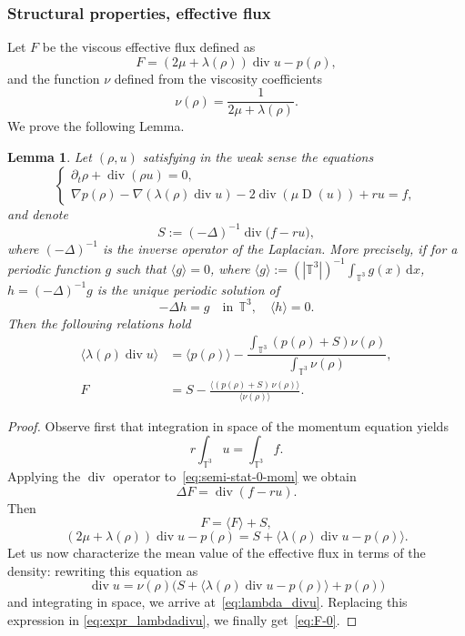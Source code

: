 \documentclass[10pt]{amsart}
\newcommand{\<}{\bigl\langle}
\renewcommand{\>}{\bigr\rangle}
\newcommand{\labeleq}[1]{}
\newenvironment{subnumcasess}{\begin{equation*}\begin{cases}}{\end{cases}\end{equation*}}
\newtheorem{lem}[thm]{Lemma}
\theoremstyle{definition}
\theoremstyle{remark}
\newcommand{\TT}{\mathbb{T}^3}
\DeclareMathOperator{\Div}{div}
\newcommand{\di}{\,\mathrm{d}}
\DeclareMathOperator{\D}{D}
\begin{document}
\subsubsection*{Structural properties, effective flux}
Let $F$ be the viscous effective flux defined as
\begin{equation*}\labeleq{df:eff_flux}
F = (2\mu + \lambda(\rho))\Div u - p(\rho),
\end{equation*}
and the function $\nu$ defined from the viscosity coefficients
\begin{equation}\label{df:nu}
\nu(\rho) = \dfrac{1}{2\mu + \lambda(\rho)}.
\end{equation}
We prove the following Lemma.
\begin{lem}
Let $(\rho,u)$ satisfying in the weak sense the equations
\begin{subnumcasess}{\labeleq{sys-0}}
\partial_t \rho + \Div (\rho u) = 0, \\
\nabla p(\rho) - \nabla(\lambda(\rho) \Div u) - 2\Div(\mu \D(u)) + ru = f,
\end{subnumcasess}%
and denote
\[
S:= (-\Delta)^{-1}\Div \big(f -r u\big),
\]
where $(-\Delta)^{-1}$ is the inverse operator of the Laplacian.
More precisely, if for a periodic function $g$ such that $\<g\> =0$, where $\<g\>:= (|\TT|)^{-1} \int_{\TT}{g(x) \di x}$, $h=(-\Delta)^{-1}g$ is the unique periodic solution of
\[
-\Delta h = g\quad \text{in}~~ \TT, \quad \<h\> = 0.
\]
Then the following relations hold
\begin{align} \label{eq:lambda_divu}
\<\lambda(\rho)\Div u\> &= \<p(\rho)\> - \dfrac{\int_{\TT}{(p(\rho)+ S)\nu(\rho)}}{\int_{\TT}{\nu(\rho)}},\\
\label{eq:F-0}
F&= S - \frac{\<(p(\rho) +S)\, \nu(\rho)\>}{\<\nu(\rho)\>}.
\end{align}
\end{lem}

\begin{proof}
Observe first that integration in space of the momentum equation yields
\begin{equation*}\labeleq{int-f-u}
r \int_{\TT}{u} = \int_{\TT}{f}.
\end{equation*}
Applying the $\Div$ operator to~\eqref{eq:semi-stat-0-mom} we obtain
\begin{equation*}
\Delta F = \Div (f-ru).
\end{equation*}
Then
\begin{equation*}
F = \<F\> + S,
\end{equation*}
\ie
\begin{equation}\label{eq:expr_lambdadivu}
(2\mu+ \lambda(\rho)) \Div u - p(\rho) = S + \< \lambda(\rho) \Div u - p(\rho) \>.
\end{equation}
Let us now characterize the mean value of the effective flux in terms of
the density: rewriting this equation as
\begin{equation*}
\Div u = \nu(\rho)\bigl(S + \<\lambda(\rho)\Div u- p(\rho) \> + p(\rho) \bigr)
\end{equation*}
and integrating in space, we arrive at~\eqref{eq:lambda_divu}.
Replacing this expression in \eqref{eq:expr_lambdadivu}, we finally get~\eqref{eq:F-0}.
\end{proof}
\end{document}

